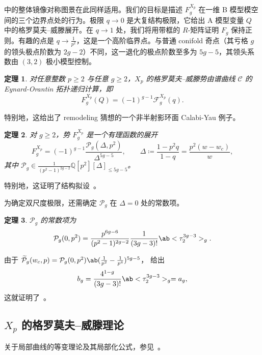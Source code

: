 \documentclass{amsart}
\newtheorem{thm}{定理}[section]
\theoremstyle{definition}
\theoremstyle{remark}
\theoremstyle{plain}
\theoremstyle{definition}
\theoremstyle{remark}
\newcommand{\Q}{\mathbb{Q}}
\newcommand{\mc}[1]{\mathcal{#1}}
\newcommand{\wt}[1]{\widetilde{#1}}
\newcommand{\1}{\mathbf{1}}
\newcommand{\2}{\mathbf{2}}
\newcommand{\3}{\mathbf{3}}
\begin{document}
 中的整体镜像对称图景在此同样适用。我们的目标是描述 \(F_g^{X_p}\) 在一维 B 模型模空间的三个边界点处的行为。极限 \(q \to 0\) 是大复结构极限，它给出 A 模型变量 \(Q\) 中的格罗莫夫–威滕展开。在 \(q \to 1\) 处，我们将用带框的 \(R\)-矩阵证明 \(F_g\) 保持正则。有趣的点是 \(q \to \frac{1}{p^2}\)，这是一个高阶临界点。与普通 conifold 奇点（其亏格 \(g\) 的领头极点阶数为 \(2g-2\)）不同，这一退化的极点阶数至多为 \(5g-5\)，其领头系数由 \((3,2)\) 极小模型控制。

\begin{thm}%
\label{thm:local P1 mirror symmetry}
    对任意整数 \(p \geq 2\) 与任意 \(g \geq 2\)，\(X_p\) 的格罗莫夫–威滕势由谱曲线 \(\mc{C}\) 的 Eynard-Orantin 拓扑递归计算，即
    \[ F_g^{X_p}(Q) = (-1)^{g-1}\mc{F}_g^{X_p}(q). \]
\end{thm}

特别地，这给出了 remodeling 猜想的一个非半射影环面 Calabi-Yau 例子。

\begin{thm}%
\label{thm:local P1 rationality}
    对 \(g \geq 2\)，势 \(F_g^{X_p}\) 是一个有理函数的展开
    \[ F_g^{X_p} = (-1)^{g-1}\frac{\mc{P}_g(\Delta,p^2)}{\Delta^{5g-5}}, \qquad \Delta \coloneqq \frac{1-p^2q}{1-q} = \frac{p^2(w-w_c)}{w}, \]
    其中 \(\mc{P}_g \in \frac{1}{(p^2-1)^{2g-2}}\Q[p^2][\Delta]_{\leq 5g-5}\)。
\end{thm}

特别地，这证明了结构拟设~。

为确定双尺度极限，还需确定 \(\mc{P}_g\) 在 \(\Delta = 0\) 处的常数项。

\begin{thm}%
\label{thm:local P1 constant term}
    \(\mc{P}_g\) 的常数项为
    \[ \mc{P}_g(0,p^2) = \frac{p^{6g-6}}{(p^2-1)^{2g-2}}\frac{1}{(3g-3)!}\ab<\tau_2^{3g-3}>_g. \]
\end{thm}

由于 \(\wt{\mc{P}}_g(w_c,p) = \mc{P}_g(0,p^2)\ab(\frac{1}{p^2}-\frac{1}{p^4})^{5g-5}\)， 给出
\[ b_g = \frac{4^{1-g}}{(3g-3)!}\ab<\tau_2^{3g-3}>_g = a_g, \]
这就证明了~。

\subsection{\(X_p\) 的格罗莫夫–威滕理论}%
\label{sub:Gromov-Witten theory of Xp}

关于局部曲线的等变理论及其局部化公式，参见~\cite{BryanPandharipande2008}。
\end{document}
